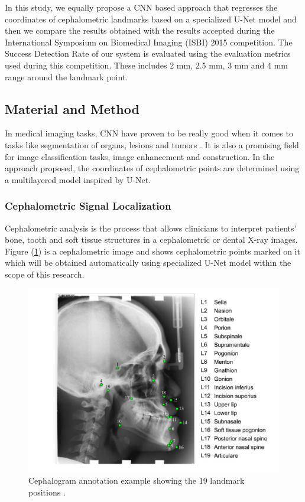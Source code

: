 \documentclass{elektr}
\begin{document}
\tab In this study, we equally propose a CNN based approach that regresses the coordinates of cephalometric landmarks based on a specialized U-Net model and then we compare the results obtained with the results accepted during the International Symposium on Biomedical Imaging (ISBI) 2015 competition. The Success Detection Rate of our system is evaluated using the evaluation metrics used during this competition. These includes 2 mm, 2.5 mm, 3 mm and 4 mm range around the landmark point. 

\subsection{Material and Method}

\tab In medical imaging tasks, CNN have proven to be really good when it comes to tasks like segmentation of organs, lesions and tumors \cite{ref7}. It is also a promising field for image classification tasks, image enhancement and construction. In the approach proposed, the coordinates of cephalometric points are determined using a multilayered model inspired by U-Net. 


\subsubsection{Cephalometric Signal Localization}
\tab Cephalometric analysis is the process that allows clinicians to interpret patients’ bone, tooth and soft tissue structures in a cephalometric or dental X-ray images. Figure (\ref{fig1}) is a cephalometric image and shows cephalometric points marked on it which will be obtained automatically using specialized U-Net model within the scope of this research.



\begin{figure}[H]
	\begin{center}
		\includegraphics[width=5.76in]{./media/image1}
		\caption{Cephalogram annotation example showing the 19 landmark positions \cite{ref8}.}
		\label{fig1}
	\end{center}\vs{-4mm}
\end{figure}
\end{document}
